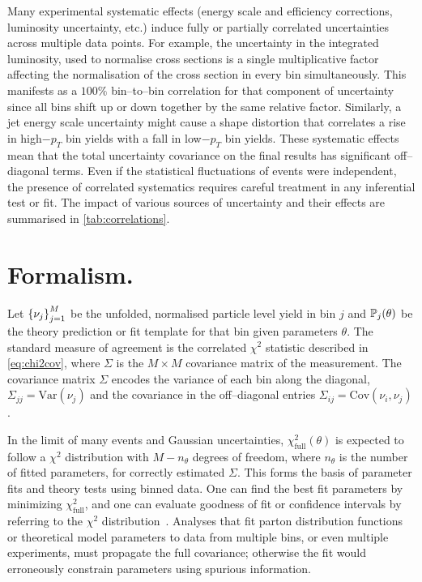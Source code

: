     Many experimental systematic effects (energy scale and efficiency corrections, luminosity uncertainty, etc.) induce fully or partially correlated uncertainties across multiple data points.
    For example, the uncertainty in the integrated luminosity, used to normalise cross sections is a single multiplicative factor affecting the normalisation of the cross section in every bin simultaneously.
    This manifests as a $100\%$ bin--to--bin correlation for that component of uncertainty since all bins shift up or down together by the same relative factor.
    Similarly, a jet energy scale uncertainty might cause a shape distortion that correlates a rise in high$-p_T$ bin yields with a fall in low$-p_T$ bin yields.
    These systematic effects mean that the total uncertainty covariance on the final results has significant off--diagonal terms.
    Even if the statistical fluctuations of events were independent, the presence of correlated systematics requires careful treatment in any inferential test or fit.
    The impact of various sources of uncertainty and their effects are summarised in \cref{tab:correlations}.


\section{Formalism.}
\label{sec:formalism}
    Let $\qty{\nu_j}_{j=1}^M$ be the unfolded, normalised particle level yield in bin $j$ and $\P_j(\theta)$ be the theory prediction or fit template for that bin given parameters $\theta$.
    The standard measure of agreement is the correlated $\chi^2$ statistic described in \cref{eq:chi2cov},
    where $\Sigma$ is the $M\times M$ covariance matrix of the measurement.
    The covariance matrix $\Sigma$ encodes the variance of each bin along the diagonal, $\Sigma_{jj} = \mathrm{Var}(\nu_j)$ and the covariance in the off--diagonal entries $\Sigma_{ij} = \mathrm{Cov}(\nu_i, \nu_j)$.
    
    In the limit of many events and Gaussian uncertainties, $\chi^2_{\text{full}}(\theta)$ is expected to follow a $\chi^2$ distribution with $M - n_{\theta}$ degrees of freedom, where $n_{\theta}$ is the number of fitted parameters, for correctly estimated \(\Sigma\).
    This forms the basis of parameter fits and theory tests using binned data.
    One can find the best fit parameters by minimizing $\chi^2_{\text{full}}$, and one can evaluate goodness of fit or confidence intervals by referring to the $\chi^2$ distribution~\cite{Hogg:2010yz, cowan_bayesian_2006, Verde:2009tu, Goswami:2025dwd, KuzminElectromagneticModel}.
    Analyses that fit parton distribution functions or theoretical model parameters to data from multiple bins, or even multiple experiments, must propagate the full covariance; otherwise the fit would erroneously constrain parameters using spurious information.

